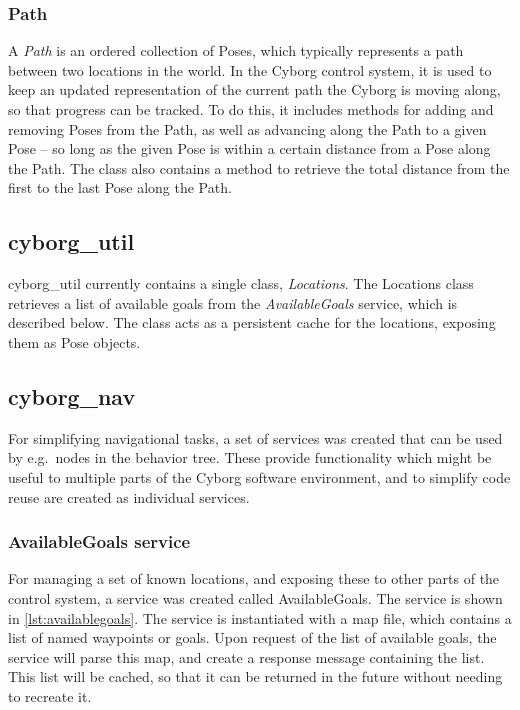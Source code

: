 \documentclass[\rootfolder/main.tex]{subfiles}
\begin{document}
\subsubsection{Path}

A \emph{Path} is an ordered collection of Poses, which typically represents a path between two locations in the world.
In the Cyborg control system, it is used to keep an updated representation of the current path the Cyborg is moving along, so that progress can be tracked.
To do this, it includes methods for adding and removing Poses from the Path, as well as advancing along the Path to a given Pose -- so long as the given Pose is within a certain distance from a Pose along the Path.
The class also contains a method to retrieve the total distance from the first to the last Pose along the Path.

\subsection{cyborg\_util}

cyborg\_util currently contains a single class, \emph{Locations}.
The Locations class retrieves a list of available goals from the \emph{AvailableGoals} service, which is described below.
The class acts as a persistent cache for the locations, exposing them as Pose objects.

\subsection{cyborg\_nav}

For simplifying navigational tasks, a set of services was created that can be used by e.g.\ nodes in the behavior tree.
These provide functionality which might be useful to multiple parts of the Cyborg software environment, and to simplify code reuse are created as individual services.

\subsubsection{AvailableGoals service}

For managing a set of known locations, and exposing these to other parts of the control system, a service was created called AvailableGoals.
The service is shown in \cref{lst:availablegoals}.
The service is instantiated with a map file, which contains a list of named waypoints or goals.
Upon request of the list of available goals, the service will parse this map, and create a response message containing the list.
This list will be cached, so that it can be returned in the future without needing to recreate it.
\end{document}
